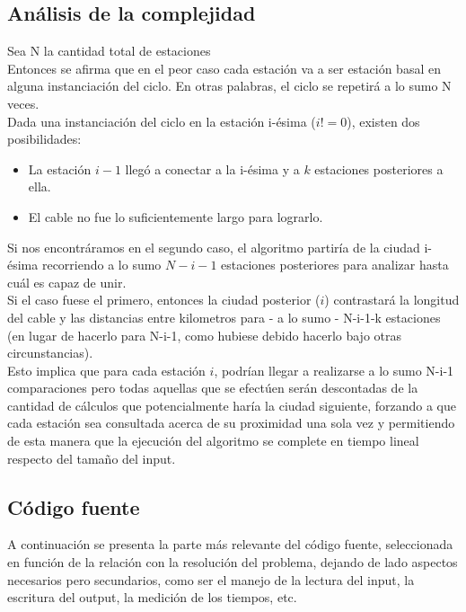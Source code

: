 \newpage
\subsection{An\'alisis de la complejidad}


Sea N la cantidad total de estaciones \\

Entonces se afirma que en el peor caso cada estación va a ser estación basal en alguna instanciación del ciclo. En otras palabras, el ciclo se repetirá a lo sumo N veces.\\
Dada una instanciación del ciclo en la estación i-ésima ($i != 0$), existen dos posibilidades:
\begin{itemize}
\item	La estación $i-1$ llegó a conectar a la i-ésima y a $k$ estaciones posteriores a ella.
\item	El cable no fue lo suficientemente largo para lograrlo.
\end{itemize}

Si nos encontráramos en el segundo caso, el algoritmo partiría de la ciudad i-ésima recorriendo a lo sumo $N-i-1$ estaciones posteriores para analizar hasta cuál es capaz de unir.\\
Si el caso fuese el primero, entonces la ciudad posterior ($i$) contrastará la longitud del cable y las distancias entre kilometros para - a lo sumo - N-i-1-k estaciones (en lugar de hacerlo para N-i-1, como hubiese debido hacerlo bajo otras circunstancias).\\

Esto implica que para cada estación $i$, podrían llegar a realizarse a lo sumo N-i-1 comparaciones pero todas aquellas que se efectúen serán descontadas de la cantidad de cálculos que potencialmente haría la ciudad siguiente, forzando a que cada estación sea consultada acerca de su proximidad una sola vez y permitiendo de esta manera que la ejecución del algoritmo se complete en tiempo lineal respecto del tamaño del input.\\ 

 \newpage
\subsection{C\'odigo fuente}

A continuación se presenta la parte más relevante del código fuente, seleccionada en función de la relación con la resolución del problema, dejando de lado aspectos necesarios pero secundarios, como ser el manejo de la lectura del input, la escritura del output, 
la medición de los tiempos, etc.


